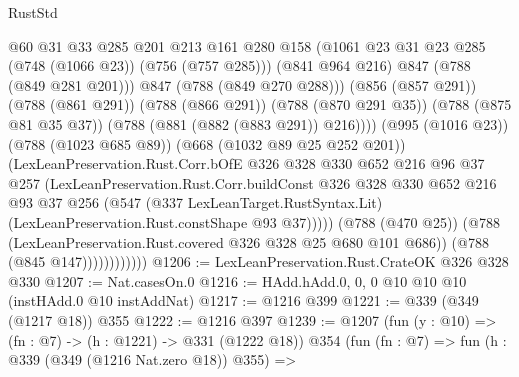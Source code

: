 \begin{lexlean}{RustStd}
\begin{coremodule}
                                  @60
                                  @31
                                  @33
                                  @285
                                  @201
                                  @213
                                  @161
                                  @280
                                  @158
                                  (@1061 @23 @31 @23 @285 (@748 (@1066 @23)) (@756 (@757 @285)))
                                  (@841 @964 @216)
                                  @847
                                  (@788 (@849 @281 @201)))
                                @847
                                (@788 (@849 @270 @288)))
                              (@856 (@857 @291))
                              (@788 (@861 @291))
                              (@788 (@866 @291))
                              (@788 (@870 @291 @35))
                              (@788 (@875 @81 @35 @37))
                              (@788 (@881 (@882 (@883 @291)) @216))))
                          (@995 (@1016 @23))
                          (@788 (@1023 @685 @89))
                          (@668 (@1032 @89 @25 @252 @201))
                          (LexLeanPreservation.Rust.Corr.bOfE
                            @326
                            @328
                            @330
                            @652
                            @216
                            @96
                            @37
                            @257
                            (LexLeanPreservation.Rust.Corr.buildConst
                              @326
                              @328
                              @330
                              @652
                              @216
                              @93
                              @37
                              @256
                              (@547
                                (@337 LexLeanTarget.RustSyntax.Lit)
                                (LexLeanPreservation.Rust.constShape @93 @37)))))
                        (@788 (@470 @25))
                        (@788 (LexLeanPreservation.Rust.covered @326 @328 @25 @680 @101 @686))
                        (@788 (@845 @147))))))))))))
@1206 := LexLeanPreservation.Rust.CrateOK @326 @328 @330
@1207 := Nat.casesOn.{0}
@1216 := HAdd.hAdd.{0, 0, 0} @10 @10 @10 (instHAdd.{0} @10 instAddNat)
@1217 := @1216 @399
@1221 := @339 (@349 (@1217 @18)) @355
@1222 := @1216 @397
@1239 := @1207
    (fun (y : @10) => (fn : @7) -> (h : @1221) -> @331 (@1222 @18))
    @354
    (fun (fn : @7) =>
    fun (h : @339 (@349 (@1216 Nat.zero @18)) @355) =>

\end{coremodule}
\end{lexlean}
